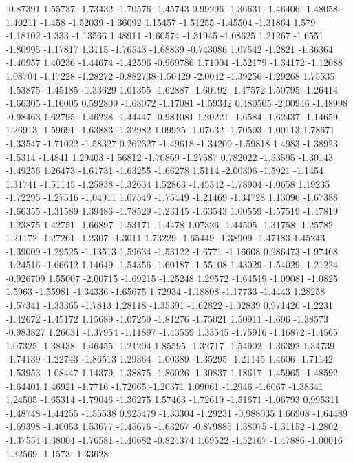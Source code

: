 \documentclass[9pt]{article}
\theoremstyle{plain}
\theoremstyle{definition}
\theoremstyle{remark}
\numberwithin{equation}{section}
\begin{document}
-0.87391
1.55737
-1.73432
-1.70576
-1.45743
0.99296
-1.36631
-1.46406
-1.48058
1.40211
-1.458
-1.52039
-1.36092
1.15457
-1.51255
-1.45504
-1.31864
1.579
-1.18102
-1.333
-1.13566
1.48911
-1.60574
-1.31945
-1.08625
1.21267
-1.6551
-1.80995
-1.17817
1.3115
-1.76543
-1.68839
-0.743086
1.07542
-1.2821
-1.36364
-1.40957
1.40236
-1.44674
-1.42506
-0.969786
1.71004
-1.52179
-1.34172
-1.12088
1.08704
-1.17228
-1.28272
-0.882738
1.50429
-2.0042
-1.39256
-1.29268
1.75535
-1.53875
-1.45185
-1.33629
1.01355
-1.62887
-1.60192
-1.47572
1.50795
-1.26414
-1.66305
-1.16005
0.592809
-1.68072
-1.17081
-1.59342
0.480505
-2.00946
-1.48998
-0.98463
1.62795
-1.46228
-1.44447
-0.981081
1.20221
-1.6584
-1.62437
-1.14659
1.26913
-1.59691
-1.63883
-1.32982
1.09925
-1.07632
-1.70503
-1.00113
1.78671
-1.33547
-1.71022
-1.58327
0.262327
-1.49618
-1.34209
-1.59818
1.4983
-1.38923
-1.5314
-1.4841
1.29403
-1.56812
-1.70869
-1.27587
0.782022
-1.53595
-1.30143
-1.49256
1.26473
-1.61731
-1.63255
-1.66278
1.5114
-2.00306
-1.5921
-1.1454
1.31741
-1.51145
-1.25838
-1.32634
1.52863
-1.45342
-1.78904
-1.0658
1.19235
-1.72295
-1.27516
-1.04911
1.07549
-1.75449
-1.21469
-1.34728
1.13096
-1.67388
-1.66355
-1.31589
1.39486
-1.78529
-1.23145
-1.63543
1.00559
-1.57519
-1.47819
-1.23875
1.42751
-1.66897
-1.53171
-1.4478
1.07326
-1.44505
-1.31758
-1.25782
1.21172
-1.27261
-1.2307
-1.3011
1.73229
-1.65449
-1.38909
-1.47183
1.45243
-1.39009
-1.29525
-1.13513
1.59634
-1.53122
-1.6771
-1.16608
0.986473
-1.97468
-1.24516
-1.66612
1.14649
-1.54356
-1.60187
-1.55108
1.43029
-1.54029
-1.21224
-0.926709
1.55007
-2.00715
-1.69215
-1.25248
1.29572
-1.64519
-1.09081
-1.0825
1.5963
-1.55981
-1.34336
-1.65675
1.72934
-1.18808
-1.17733
-1.4443
1.28258
-1.57341
-1.33365
-1.7813
1.28118
-1.35391
-1.62822
-1.02839
0.971426
-1.2231
-1.42672
-1.45172
1.15689
-1.07259
-1.81276
-1.75021
1.50911
-1.696
-1.38573
-0.983827
1.26631
-1.37954
-1.11897
-1.43559
1.33545
-1.75916
-1.16872
-1.4565
1.07325
-1.38438
-1.46455
-1.21204
1.85595
-1.32717
-1.54902
-1.36392
1.34739
-1.74139
-1.22743
-1.86513
1.29364
-1.00389
-1.35295
-1.21145
1.4606
-1.71142
-1.53953
-1.08447
1.14379
-1.38875
-1.86026
-1.30837
1.18617
-1.45965
-1.48592
-1.64401
1.46921
-1.7716
-1.72065
-1.20371
1.09061
-1.2946
-1.6067
-1.38341
1.24505
-1.65314
-1.79046
-1.36275
1.57463
-1.72619
-1.51671
-1.06793
0.995311
-1.48748
-1.44255
-1.55538
0.925479
-1.33304
-1.29231
-0.988035
1.66908
-1.64489
-1.69398
-1.40053
1.53677
-1.45676
-1.63267
-0.879885
1.38075
-1.31152
-1.2802
-1.37554
1.38004
-1.76581
-1.40682
-0.824374
1.69522
-1.52167
-1.47886
-1.00016
1.32569
-1.1573
-1.33628
\end{document}
